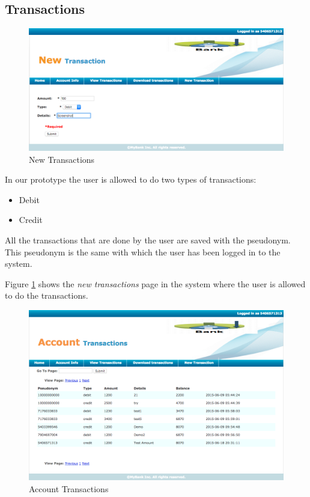 \subsection{Transactions}
\begin{figure}
	\centering
	\includegraphics[width=\textwidth]{figures/New}
	\caption{New Transactions}
	\label{fig:New}
\end{figure}
In our prototype the user is allowed to do two types of transactions:
\begin{itemize}
	\item Debit
	\item Credit
\end{itemize}
All the transactions that are done by the user are saved with the pseudonym. This pseudonym is the same with which the user has been logged in to the system.

Figure \ref{fig:New} shows the \textit{new transactions} page in the system where the user is allowed to do the transactions.
\begin{figure}[h]
	\centering
	\includegraphics[width=\textwidth]{figures/Transactions}
	\caption{Account Transactions}
	\label{fig:Transactions}
\end{figure}

